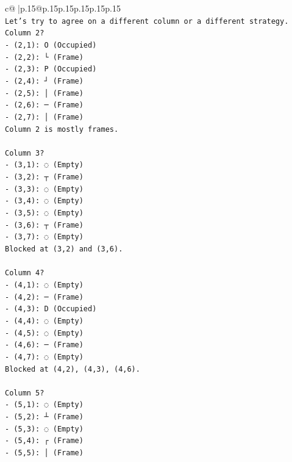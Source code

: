 \documentclass{article}
\begin{document}
{\begin{supertabular}{c@{$\;$}|p{.15\linewidth}@{}p{.15\linewidth}p{.15\linewidth}p{.15\linewidth}p{.15\linewidth}p{.15\linewidth}}
{{{\\ 
\texttt{Let's try to agree on a different column or a different strategy. Column 2?} \\
\texttt{{-} (2,1): O (Occupied)} \\
\texttt{{-} (2,2): └ (Frame)} \\
\texttt{{-} (2,3): P (Occupied)} \\
\texttt{{-} (2,4): ┘ (Frame)} \\
\texttt{{-} (2,5): │ (Frame)} \\
\texttt{{-} (2,6): ─ (Frame)} \\
\texttt{{-} (2,7): │ (Frame)} \\
\texttt{Column 2 is mostly frames.} \\
\\ 
\texttt{Column 3?} \\
\texttt{{-} (3,1): ◌ (Empty)} \\
\texttt{{-} (3,2): ┬ (Frame)} \\
\texttt{{-} (3,3): ◌ (Empty)} \\
\texttt{{-} (3,4): ◌ (Empty)} \\
\texttt{{-} (3,5): ◌ (Empty)} \\
\texttt{{-} (3,6): ┬ (Frame)} \\
\texttt{{-} (3,7): ◌ (Empty)} \\
\texttt{Blocked at (3,2) and (3,6).} \\
\\ 
\texttt{Column 4?} \\
\texttt{{-} (4,1): ◌ (Empty)} \\
\texttt{{-} (4,2): ─ (Frame)} \\
\texttt{{-} (4,3): D (Occupied)} \\
\texttt{{-} (4,4): ◌ (Empty)} \\
\texttt{{-} (4,5): ◌ (Empty)} \\
\texttt{{-} (4,6): ─ (Frame)} \\
\texttt{{-} (4,7): ◌ (Empty)} \\
\texttt{Blocked at (4,2), (4,3), (4,6).} \\
\\ 
\texttt{Column 5?} \\
\texttt{{-} (5,1): ◌ (Empty)} \\
\texttt{{-} (5,2): ┴ (Frame)} \\
\texttt{{-} (5,3): ◌ (Empty)} \\
\texttt{{-} (5,4): ┌ (Frame)} \\
\texttt{{-} (5,5): │ (Frame)} \\
}}}
\end{supertabular}}
\end{document}
